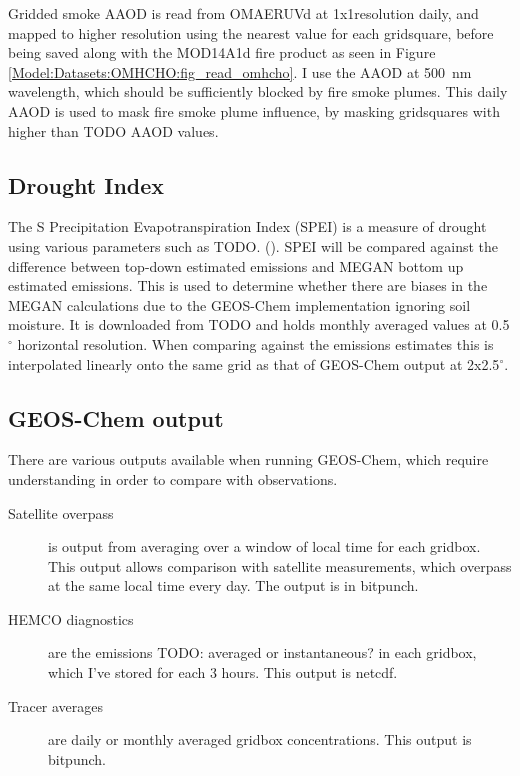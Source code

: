      
      Gridded smoke AAOD is read from OMAERUVd at 1x1\degr resolution daily, and mapped to higher resolution using the nearest value for each gridsquare, before being saved along with the MOD14A1d fire product as seen in Figure \ref{Model:Datasets:OMHCHO:fig_read_omhcho}.
      I use the AAOD at 500~nm wavelength, which should be sufficiently blocked by fire smoke plumes.
      This daily AAOD is used to mask fire smoke plume influence, by masking gridsquares with higher than TODO AAOD values.
      
  
  \subsection{Drought Index}
    The S Precipitation Evapotranspiration Index (SPEI) is a measure of drought using various parameters such as TODO. (\cite{Wang2017}).
    SPEI will be compared against the difference between top-down estimated emissions and MEGAN bottom up estimated emissions. 
    This is used to determine whether there are biases in the MEGAN calculations due to the GEOS-Chem implementation ignoring soil moisture.
    It is downloaded from TODO and holds monthly averaged values at 0.5$^{\circ}$ horizontal resolution.
    When comparing against the emissions estimates this is interpolated linearly onto the same grid as that of GEOS-Chem output at 2x2.5$^{\circ}$.
  
  \subsection{GEOS-Chem output}
    There are various outputs available when running GEOS-Chem, which require understanding in order to compare with observations.
    \begin{description}
      \item[Satellite overpass] is output from averaging over a window of local time for each gridbox. 
      This output allows comparison with satellite measurements, which overpass at the same local time every day.
      The output is in bitpunch.
      \item[HEMCO diagnostics] are the emissions TODO: averaged or instantaneous? in each gridbox, which I've stored for each 3 hours.
      This output is netcdf.
      \item[Tracer averages] are daily or monthly averaged gridbox concentrations.
      This output is bitpunch.
    
  \end{description}

